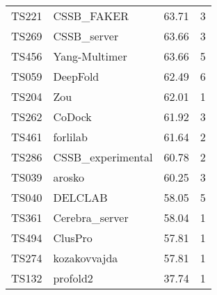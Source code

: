 \begin{table}[ht]
{\begin{tabular}{llrr}
TS221 & CSSB\_FAKER & 63.71 & 3 \\ 
TS269 & CSSB\_server & 63.66 & 3 \\ 
TS456 & Yang-Multimer & 63.66 & 5 \\ 
TS059 & DeepFold & 62.49 & 6 \\ 
TS204 & Zou & 62.01 & 1 \\ 
TS262 & CoDock & 61.92 & 3 \\ 
TS461 & forlilab & 61.64 & 2 \\ 
TS286 & CSSB\_experimental & 60.78 & 2 \\ 
TS039 & arosko & 60.25 & 3 \\ 
TS040 & DELCLAB & 58.05 & 5 \\ 
TS361 & Cerebra\_server & 58.04 & 1 \\ 
TS494 & ClusPro & 57.81 & 1 \\ 
TS274 & kozakovvajda & 57.81 & 1 \\ 
TS132 & profold2 & 37.74 & 1 \\ 
\bottomrule
\end{tabular}%
}
\end{table}
